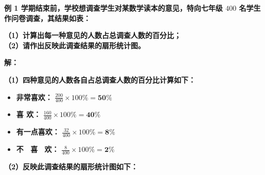 \vspace{0.6cm}

\textbf{例 1 \quad 学期结束前，学校想调查学生对某数学读本的意见，特向七年级 $400$ 名学生作问卷调查，其结果如表：}

\vspace{0.2cm}
\begin{center}
\renewcommand{\arraystretch}{1.6}
\end{center}

\vspace{0.4cm}

\textbf{（1）计算出每一种意见的人数占总调查人数的百分比；} \\
\textbf{（2）请作出反映此调查结果的扇形统计图。}

\vspace{0.4cm}
\textbf{解：}

\textbf{（1）四种意见的人数各自占总调查人数的百分比计算如下：}
\begin{itemize}
    \item \textbf{非常喜欢：} $\displaystyle \frac{200}{400} \times 100\% = \boldsymbol{50\%}$
    \vspace{0.1cm}
    \item \textbf{喜 \qquad 欢：} $\displaystyle \frac{160}{400} \times 100\% = \boldsymbol{40\%}$
    \vspace{0.1cm}
    \item \textbf{有一点喜欢：} $\displaystyle \frac{32}{400} \times 100\% = \boldsymbol{8\%}$
    \vspace{0.1cm}
    \item \textbf{不 \ 喜 \ 欢：} $\displaystyle \frac{8}{400} \times 100\% = \boldsymbol{2\%}$
\end{itemize}

\vspace{0.4cm}
\textbf{（2）反映此调查结果的扇形统计图如下：}


